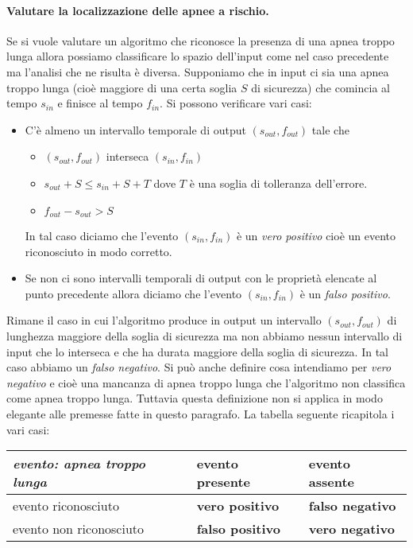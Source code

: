 \paragraph{Valutare la localizzazione delle apnee a rischio.}
Se si vuole valutare un algoritmo che riconosce la presenza di una apnea troppo lunga allora possiamo classificare lo spazio dell'input come nel caso precedente ma l'analisi che ne risulta \`e diversa.
Supponiamo che in input ci sia una apnea troppo lunga (cio\`e maggiore di una certa soglia $S$ di sicurezza) che comincia al tempo $s_{in}$ e finisce al tempo $f_{in}$. Si possono verificare vari casi:
\begin{itemize}
  \item
    C'\`e almeno un intervallo temporale di output $(s_{out}, f_{out})$ tale che 
    \begin{itemize}
      \item 
	$(s_{out}, f_{out})$ interseca $(s_{in}, f_{in})$
      \item
	$s_{out} + S \leq s_{in} + S + T$ dove $T$ \`e una soglia di tolleranza dell'errore.
      \item
	$f_{out}-s_{out}>S$
    \end{itemize}
    In tal caso diciamo che l'evento $(s_{in}, f_{in})$ \`e un \emph{vero positivo} cio\`e un evento riconosciuto in modo corretto.
  \item
    Se non ci sono intervalli temporali di output con le propriet\`a elencate al punto precedente allora diciamo che l'evento $(s_{in}, f_{in})$ \`e un \emph{falso positivo}.
\end{itemize}
Rimane il caso in cui l'algoritmo produce in output un intervallo $(s_{out}, f_{out})$ di lunghezza maggiore della soglia di sicurezza ma non abbiamo nessun intervallo di input che lo interseca e che ha durata maggiore della soglia di sicurezza. 
In tal caso abbiamo un \emph{falso negativo}. 
Si pu\`o anche definire cosa intendiamo per \emph{vero negativo} e cio\`e una mancanza di apnea troppo lunga che l'algoritmo non classifica come apnea troppo lunga. 
Tuttavia questa definizione non si applica in modo elegante alle premesse fatte in questo paragrafo. 
La tabella seguente ricapitola i vari casi:
\begin{center}
    \begin{tabular}{|l|ll|}
      \hline
      \emph{evento: apnea troppo lunga} & evento presente & evento assente \\
      \hline
      evento riconosciuto        & \bf{vero positivo}   & \bf{falso negativo} \\
      evento non riconosciuto    & \bf{falso positivo}  & \bf{vero negativo}  \\
      \hline
    \end{tabular}
\end{center}

